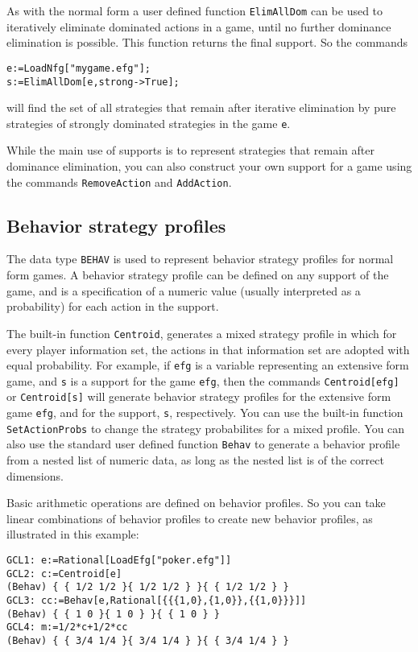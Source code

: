 As with the normal form a user defined function \verb+ElimAllDom+ can
be used to iteratively eliminate dominated actions in a game, until
no further dominance elimination is possible.  This function returns
the final support.  So the commands

\begin{verbatim}
e:=LoadNfg["mygame.efg"];
s:=ElimAllDom[e,strong->True];
\end{verbatim}

will find the set of all strategies that remain after iterative
elimination by pure strategies of strongly dominated strategies in
the game \verb+e+.

While the main use of supports is to represent strategies that
remain after dominance elimination, you can also construct your own
support for a game using the commands \verb+RemoveAction+ and
\verb+AddAction+.

\subsection{Behavior strategy profiles}

The data type \verb+BEHAV+ is used to represent behavior strategy
profiles for normal form games.  A behavior strategy profile can be
defined on any support of the game, and is a specification of a
numeric value (usually interpreted as a probability) for each action
in the support.

The built-in function \verb+Centroid+, generates a mixed strategy
profile in which for every player information set, the actions in that
information set are adopted with equal probability.  For example, if
\verb+efg+ is a variable representing an extensive form game, and \verb+s+
is a support for the game \verb+efg+, then the commands
\verb+Centroid[efg]+ or \verb+Centroid[s]+ will generate behavior
strategy profiles for the extensive form game \verb+efg+, and for the
support, \verb+s+, respectively.  You can use the built-in function
\verb+SetActionProbs+ to change the strategy probabilites for a
mixed profile.  You can also use the standard user defined function
\verb+Behav+ to generate a behavior profile from a nested list of numeric
data, as long as the nested list is of the correct dimensions.

Basic arithmetic operations are defined on behavior profiles.  So you
can take linear combinations of behavior profiles to create new
behavior profiles, as illustrated in this example:

\begin{verbatim}  
GCL1: e:=Rational[LoadEfg["poker.efg"]]
GCL2: c:=Centroid[e]
(Behav) { { 1/2 1/2 }{ 1/2 1/2 } }{ { 1/2 1/2 } }
GCL3: cc:=Behav[e,Rational[{{{1,0},{1,0}},{{1,0}}}]]
(Behav) { { 1 0 }{ 1 0 } }{ { 1 0 } }
GCL4: m:=1/2*c+1/2*cc
(Behav) { { 3/4 1/4 }{ 3/4 1/4 } }{ { 3/4 1/4 } }
\end{verbatim}

